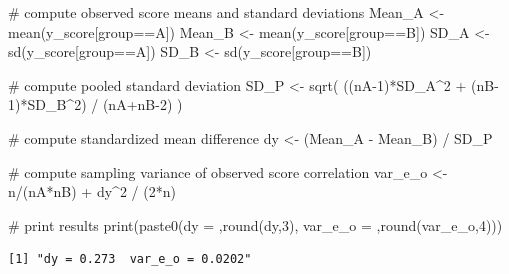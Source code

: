 \documentclass[
  letterpaper,
  DIV=11,
  numbers=noendperiod]{scrreprt}
\newenvironment{Shaded}{\begin{snugshade}}{\end{snugshade}}
\newcommand{\CommentTok}[1]{\textcolor[rgb]{0.37,0.37,0.37}{#1}}
\newcommand{\DecValTok}[1]{\textcolor[rgb]{0.68,0.00,0.00}{#1}}
\newcommand{\FunctionTok}[1]{\textcolor[rgb]{0.28,0.35,0.67}{#1}}
\newcommand{\NormalTok}[1]{\textcolor[rgb]{0.00,0.23,0.31}{#1}}
\newcommand{\OtherTok}[1]{\textcolor[rgb]{0.00,0.23,0.31}{#1}}
\newcommand{\SpecialCharTok}[1]{\textcolor[rgb]{0.37,0.37,0.37}{#1}}
\newcommand{\StringTok}[1]{\textcolor[rgb]{0.13,0.47,0.30}{#1}}
\begin{document}
\begin{Shaded}
\begin{Highlighting}[]
\CommentTok{\# compute observed score means and standard deviations}
\NormalTok{Mean\_A }\OtherTok{\textless{}{-}} \FunctionTok{mean}\NormalTok{(y\_score[group}\SpecialCharTok{==}\StringTok{\textquotesingle{}A\textquotesingle{}}\NormalTok{])}
\NormalTok{Mean\_B }\OtherTok{\textless{}{-}} \FunctionTok{mean}\NormalTok{(y\_score[group}\SpecialCharTok{==}\StringTok{\textquotesingle{}B\textquotesingle{}}\NormalTok{])}
\NormalTok{SD\_A }\OtherTok{\textless{}{-}} \FunctionTok{sd}\NormalTok{(y\_score[group}\SpecialCharTok{==}\StringTok{\textquotesingle{}A\textquotesingle{}}\NormalTok{])}
\NormalTok{SD\_B }\OtherTok{\textless{}{-}} \FunctionTok{sd}\NormalTok{(y\_score[group}\SpecialCharTok{==}\StringTok{\textquotesingle{}B\textquotesingle{}}\NormalTok{])}

\CommentTok{\# compute pooled standard deviation}
\NormalTok{SD\_P }\OtherTok{\textless{}{-}} \FunctionTok{sqrt}\NormalTok{( ((nA}\DecValTok{{-}1}\NormalTok{)}\SpecialCharTok{*}\NormalTok{SD\_A}\SpecialCharTok{\^{}}\DecValTok{2} \SpecialCharTok{+}\NormalTok{ (nB}\DecValTok{{-}1}\NormalTok{)}\SpecialCharTok{*}\NormalTok{SD\_B}\SpecialCharTok{\^{}}\DecValTok{2}\NormalTok{) }\SpecialCharTok{/}\NormalTok{ (nA}\SpecialCharTok{+}\NormalTok{nB}\DecValTok{{-}2}\NormalTok{) )}

\CommentTok{\# compute standardized mean difference}
\NormalTok{dy }\OtherTok{\textless{}{-}}\NormalTok{ (Mean\_A }\SpecialCharTok{{-}}\NormalTok{ Mean\_B) }\SpecialCharTok{/}\NormalTok{ SD\_P}

\CommentTok{\# compute sampling variance of observed score correlation}
\NormalTok{var\_e\_o }\OtherTok{\textless{}{-}}\NormalTok{ n}\SpecialCharTok{/}\NormalTok{(nA}\SpecialCharTok{*}\NormalTok{nB) }\SpecialCharTok{+}\NormalTok{ dy}\SpecialCharTok{\^{}}\DecValTok{2} \SpecialCharTok{/}\NormalTok{ (}\DecValTok{2}\SpecialCharTok{*}\NormalTok{n)}

\CommentTok{\# print results}
\FunctionTok{print}\NormalTok{(}\FunctionTok{paste0}\NormalTok{(}\StringTok{\textquotesingle{}dy = \textquotesingle{}}\NormalTok{,}\FunctionTok{round}\NormalTok{(dy,}\DecValTok{3}\NormalTok{),}\StringTok{\textquotesingle{}  var\_e\_o = \textquotesingle{}}\NormalTok{,}\FunctionTok{round}\NormalTok{(var\_e\_o,}\DecValTok{4}\NormalTok{)))}
\end{Highlighting}
\end{Shaded}

\begin{verbatim}
[1] "dy = 0.273  var_e_o = 0.0202"
\end{verbatim}
\end{document}
